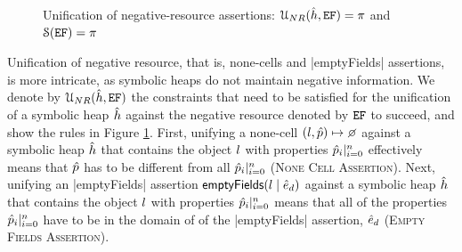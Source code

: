 \begin{figure}
{\scriptsize
{}}
\vspace*{-0.6cm}
\caption{Unification of negative-resource assertions: ${\cal U}_{NR}(\hat{h}, \mathtt{EF}) = \pi$ and ${\cal S}(\mathtt{EF}) = \pi$}
\label{fig:unineg}
\vspace*{-0.2cm}
\end{figure}

Unification of negative resource, that is, none-cells and \jsinline|emptyFields| assertions, is more intricate, as symbolic heaps do not maintain negative information. We denote by ${\cal U}_{NR}(\hat{h}, \mathtt{EF})$ the constraints that need to be satisfied for the unification of a symbolic heap $\hat{h}$ against the negative resource denoted by $\mathtt{EF}$ to succeed, and show the rules in Figure \ref{fig:unineg}. First, unifying a none-cell $(\loc,\sexprp)\pointsto \none$ against a symbolic heap $\hat{h}$ that contains the object $l$ with properties $\hat{p}_i|_{i=0}^n$  effectively means that $\hat{p}$ has to be different from all $\hat{p}_i|_{i=0}^n$ (\textsc{None Cell Assertion}). Next, unifying an  \jsinline|emptyFields| assertion $\mathsf{emptyFields}(l \mid \hat{e}_d)$ against a symbolic heap $\hat{h}$ that contains the object $l$ with properties $\hat{p}_i|_{i=0}^n$  means that all of the properties $\hat{p}_i|_{i=0}^n$  have to be in the domain of of the \jsinline|emptyFields| assertion, $\hat{e}_d$ (\textsc{Empty Fields Assertion}). 

